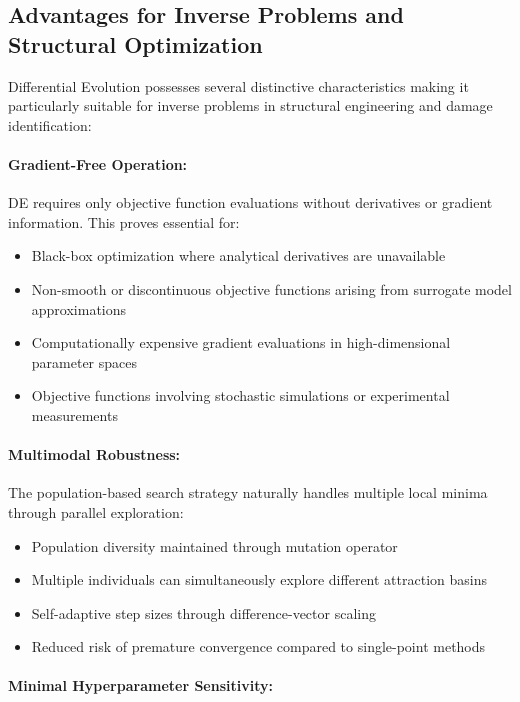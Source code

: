 \documentclass[12pt,a4paper]{report}
\begin{document}
\subsection{Advantages for Inverse Problems and Structural Optimization}

Differential Evolution possesses several distinctive characteristics making it particularly suitable for inverse problems in structural engineering and damage identification:

\paragraph{Gradient-Free Operation:}

DE requires only objective function evaluations without derivatives or gradient information. This proves essential for:
\begin{itemize}
    \item Black-box optimization where analytical derivatives are unavailable
    \item Non-smooth or discontinuous objective functions arising from surrogate model approximations
    \item Computationally expensive gradient evaluations in high-dimensional parameter spaces
    \item Objective functions involving stochastic simulations or experimental measurements
\end{itemize}

\paragraph{Multimodal Robustness:}

The population-based search strategy naturally handles multiple local minima through parallel exploration:
\begin{itemize}
    \item Population diversity maintained through mutation operator
    \item Multiple individuals can simultaneously explore different attraction basins
    \item Self-adaptive step sizes through difference-vector scaling
    \item Reduced risk of premature convergence compared to single-point methods
\end{itemize}

\paragraph{Minimal Hyperparameter Sensitivity:}
\end{document}

